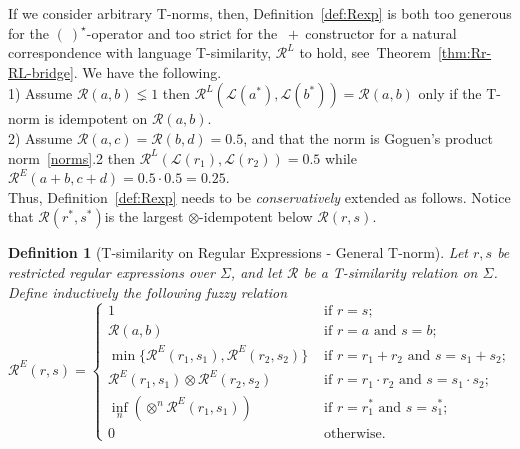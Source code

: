 \documentclass{article}
\newtheorem{definition}{Definition}[section]
\begin{document}

If we consider arbitrary T-norms, then, Definition~\ref{def:Rexp} is both too generous for the $(\ )^\star$-operator and too strict for the $\ +\ $constructor for a natural  correspondence with language T-similarity, $\mathcal R^L$ to hold, see~Theorem~\ref{thm:Rr-RL-bridge}. 
We have the following.\\ 1) Assume $\mathcal R(a,b)\lneq 1$ then $\mathcal R^L(\mathcal L(a^*),\mathcal L(b^*))= \mathcal R(a,b)$ only if the T-norm is idempotent on $\mathcal R(a,b)$. \\ 2) Assume
\(\mathcal R(a,c)=\mathcal R(b,d)=0.5\), and that the norm is Goguen's product norm~\ref{norms}.2 then \(\mathcal R^L(\mathcal L(r_1),\mathcal L(r_2))=0.5\) while \(\mathcal R^E(a+b,c+d)=0.5\cdot0.5=0.25\).\\
Thus, Definition~\ref{def:Rexp} needs to be {\em conservatively} extended as follows. Notice that $\mathcal R(r^*,s^*)$is the  largest $\otimes$-idempotent below  $\mathcal R(r,s)$.

\begin{definition}[T-similarity on Regular Expressions - General T-norm] \label{def:Rexpg}
Let $r,s$ be restricted regular expressions over $\Sigma$, and let $\mathcal{R}$ be a T-similarity relation on $\Sigma$. Define inductively the following fuzzy relation
$$\mathcal{R}^E(r,s) = \begin{cases}1 & \mbox{ if } r=s; \\
                                                       \mathcal{R}(a,b) & \mbox{ if } r=a \mbox{ and } s=b; \\
                                                      \min\!{\big\{\mathcal{R}^E(r_1,s_1), \mathcal{R}^E(r_2,s_2) \big\}}& \mbox{ if } r=r_1+r_2 \mbox{ and } s=s_1+s_2; \\
                                                      \mathcal{R}^E(r_1,s_1) \otimes \mathcal{R}^E(r_2,s_2) & \mbox{ if } r=r_1\cdot r_2 \mbox{ and } s=s_1\cdot s_2; \\
                                                       \inf_n( \otimes^n \mathcal{R}^E(r_1,s_1) ) & \mbox{ if } r=r_1^* \mbox{ and } s=s_1^*; \\
                                                        0 & \mbox{ otherwise.}
\end{cases}$$
\end{definition}
\end{document}
